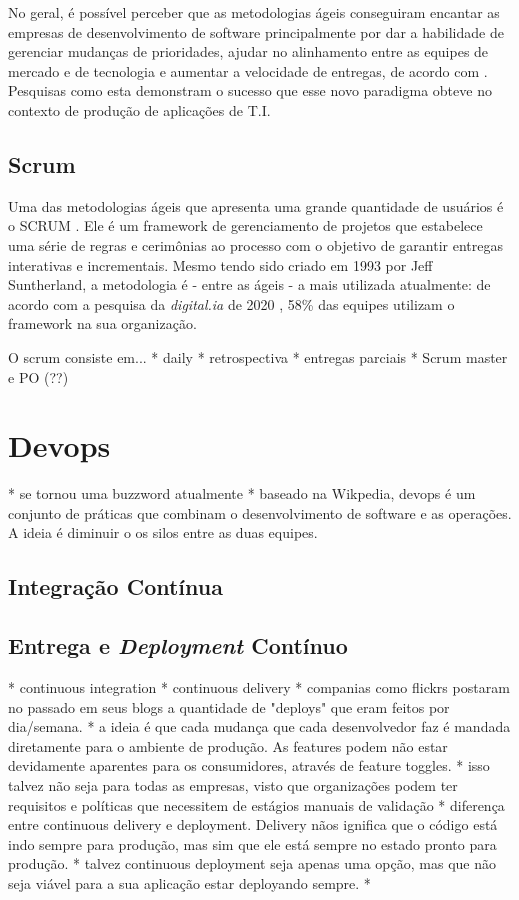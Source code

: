 No geral, é possível perceber que as metodologias ágeis conseguiram encantar as empresas de desenvolvimento de software principalmente por dar a habilidade de gerenciar mudanças de prioridades, ajudar no alinhamento entre as equipes de mercado e de tecnologia e aumentar a velocidade de entregas, de acordo com \cite{stateAgileReport2020}. Pesquisas como esta demonstram o sucesso que esse novo paradigma obteve no contexto de produção de aplicações de T.I. 

\subsection{Scrum}
Uma das metodologias ágeis que apresenta uma grande quantidade de usuários é o SCRUM \cite{scrumBook}. Ele é um framework de gerenciamento de projetos que estabelece uma série de regras e cerimônias ao processo com o objetivo de garantir entregas interativas e incrementais. Mesmo tendo sido criado em 1993 por Jeff Suntherland, a metodologia é - entre as ágeis - a mais utilizada atualmente: de acordo com a pesquisa da \emph{digital.ia} de 2020 \cite{stateAgileReport2020}, 58\% das equipes utilizam o framework na sua organização.

O scrum consiste em...
* daily
* retrospectiva
* entregas parciais
* Scrum master e PO (??)


\section{Devops}
 
    * se tornou uma buzzword atualmente
    * baseado na Wikpedia, devops é um conjunto de práticas que combinam o desenvolvimento de software e as operações. A  ideia é diminuir o os silos entre as duas equipes.


\subsection{Integração Contínua}

\subsection{Entrega e \emph{Deployment} Contínuo}
* continuous integration
* continuous delivery
    * companias como flickrs postaram no passado em seus blogs a quantidade de "deploys" que eram feitos por dia/semana.
    * a ideia é que cada mudança que cada desenvolvedor faz é mandada diretamente para o ambiente de produção.
    As features podem não estar devidamente aparentes para os consumidores, através de feature toggles.
    * isso talvez não seja para todas as empresas, visto que organizações podem ter requisitos e políticas que necessitem de estágios manuais de validação
    * diferença entre continuous delivery e deployment. Delivery nãos ignifica que o código está indo sempre para produção, mas sim que ele está sempre no estado pronto para produção. 
    * talvez continuous deployment seja apenas uma opção, mas que não seja viável para a sua aplicação estar deployando sempre.
    * 

